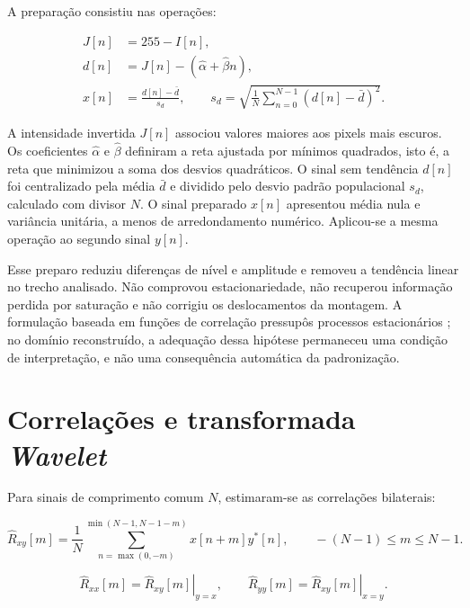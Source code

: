 A preparação consistiu nas operações:

\begin{align}
  J[n]&=255-I[n], \label{eq:met-inversao}\\
  d[n]&=J[n]-(\widehat\alpha+\widehat\beta n), \label{eq:met-tendencia}\\
  x[n]&=\frac{d[n]-\bar d}{s_d},\qquad
  s_d=\sqrt{\frac{1}{N}\sum_{n=0}^{N-1}(d[n]-\bar d)^2}.
  \label{eq:met-padronizacao}
\end{align}

\noindent
A intensidade invertida $J[n]$ associou valores maiores aos pixels mais escuros.
Os coeficientes $\widehat\alpha$ e $\widehat\beta$ definiram a reta ajustada por
mínimos quadrados, isto é, a reta que minimizou a soma dos desvios quadráticos.
O sinal sem tendência $d[n]$ foi centralizado pela média $\bar d$ e dividido pelo
desvio padrão populacional $s_d$, calculado com divisor $N$. O sinal preparado
$x[n]$ apresentou média nula e variância unitária, a menos de arredondamento
numérico. Aplicou-se a mesma operação ao segundo sinal $y[n]$.

Esse preparo reduziu diferenças de nível e amplitude e removeu a tendência linear
no trecho analisado. Não comprovou estacionariedade, não recuperou informação
perdida por saturação e não corrigiu os deslocamentos da montagem. A formulação
baseada em funções de correlação pressupôs processos estacionários
\cite{schuck2019}; no domínio reconstruído, a adequação dessa hipótese permaneceu
uma condição de interpretação, e não uma consequência automática da padronização.

\section{Correlações e transformada \textit{Wavelet}}\label{sec:met-wco}

Para sinais de comprimento comum $N$, estimaram-se as correlações bilaterais:

\begin{equation}\label{eq:crosscorr-disc}
  \widehat R_{xy}[m]=\frac{1}{N}
  \sum_{n=\max(0,-m)}^{\min(N-1,N-1-m)}
  x[n+m]y^*[n],\qquad -(N-1)\leq m\leq N-1.
\end{equation}

\begin{equation}\label{eq:autocorr-disc}
  \widehat R_{xx}[m]=\left.\widehat R_{xy}[m]\right|_{y=x},
  \qquad
  \widehat R_{yy}[m]=\left.\widehat R_{xy}[m]\right|_{x=y}.
\end{equation}

